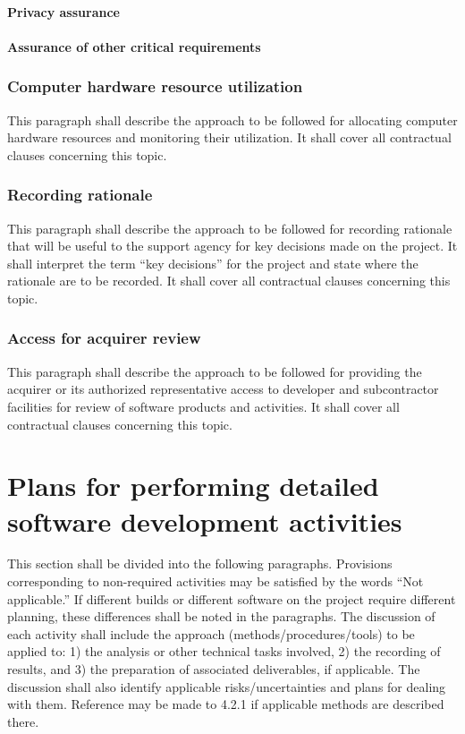 \documentclass{fidata-report-template}
\begin{document}
\paragraph{Privacy assurance}

\paragraph{Assurance of other critical requirements}

\subsubsection{Computer hardware resource utilization}

This paragraph shall describe the approach to be followed for allocating
computer hardware resources and monitoring their utilization. It shall
cover all contractual clauses concerning this topic.

\subsubsection{Recording rationale}

This paragraph shall describe the approach to be followed for recording
rationale that will be useful to the support agency for key decisions
made on the project. It shall interpret the term ``key decisions'' for
the project and state where the rationale are to be recorded. It shall
cover all contractual clauses concerning this topic.

\subsubsection{Access for acquirer review}

This paragraph shall describe the approach to be followed for providing
the acquirer or its authorized representative access to developer and
subcontractor facilities for review of software products and activities.
It shall cover all contractual clauses concerning this topic.

\section{Plans for performing detailed software development
activities}

This section shall be divided into the following paragraphs. Provisions
corresponding to non-required activities may be satisfied by the words
``Not applicable.'' If different builds or different software on the
project require different planning, these differences shall be noted in
the paragraphs. The discussion of each activity shall include the
approach (methods/procedures/tools) to be applied to: 1) the analysis
or other technical tasks involved, 2) the recording of results, and 3)
the preparation of associated deliverables, if applicable. The
discussion shall also identify applicable risks/uncertainties and plans
for dealing with them. Reference may be made to 4.2.1 if applicable
methods are described there.
\end{document}
